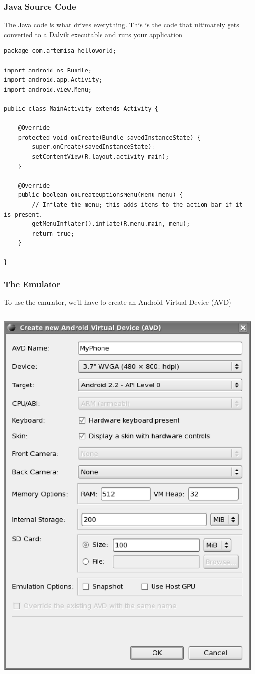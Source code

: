 \begin{frame}[fragile]
\frametitle{Java Source Code}
The Java code is what drives everything. This is the code that ultimately gets converted
to a Dalvik executable and runs your application
\lstset{language=java, style=eclipse, tabsize=2}
\begin{adjustbox}{width=0.85 \textwidth}
\begin{lstlisting}[caption=src/com/artemisa/helloworld/MainActivity.java]
package com.artemisa.helloworld;

import android.os.Bundle;
import android.app.Activity;
import android.view.Menu;

public class MainActivity extends Activity {

	@Override
	protected void onCreate(Bundle savedInstanceState) {
		super.onCreate(savedInstanceState);
		setContentView(R.layout.activity_main);
	}

	@Override
	public boolean onCreateOptionsMenu(Menu menu) {
		// Inflate the menu; this adds items to the action bar if it is present.
		getMenuInflater().inflate(R.menu.main, menu);
		return true;
	}

}
\end{lstlisting}
\end{adjustbox}
\end{frame}
\begin{frame}
\frametitle{The Emulator}
To use the emulator, we’ll have to create an Android Virtual Device (AVD)
\begin{columns}
\centering
\includegraphics[width= 0.35 \textwidth]{CreateNewAndroidVitualDevice.eps}
\end{columns}
\end{frame}

